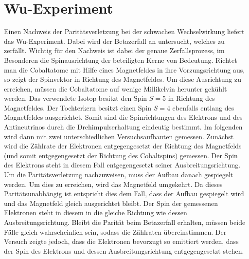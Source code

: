 \documentclass[twoside,colorback,accentcolor=tud4c,11pt]{tudreport}
\begin{document}
\section{Wu-Experiment}
Einen Nachweis der Paritätsverletzung bei der schwachen Wechselwirkung liefert das Wu-Experiment. Dabei wird der Betazerfall an  untersucht, welches zu  zerfällt. Wichtig für den Nachweis ist dabei der genaue Zerfallsprozess, im Besonderen die Spinausrichtung der beteiligten Kerne von Bedeutung. Richtet man die Cobaltatome mit Hilfe eines Magnetfeldes in ihre Vorzungsrichtung aus, so zeigt der Spinvektor in Richtung des Magnetfeldes. Um diese Ausrichtung zu erreichen, müssen die Cobaltatome auf wenige Millikelvin herunter gekühlt werden. Das verwendete Isotop besitzt den Spin $S=5$ in Richtung des Magnetfeldes. Der Tochterkern besitzt einen Spin $S=4$ ebenfalls entlang des Magnetfeldes ausgerichtet. Somit sind die Spinrichtungen des Elektrons und des Antineutrinos durch die Drehimpulserhaltung eindeutig bestimmt. Im folgenden wird dann mit zwei unterschiedlichen Versuchsaufbauten gemessen. Zunächst 
wird die Zählrate der Elektronen entgegengesetzt der Richtung des Magnetfelds (und somit entgegengesetzt der Richtung des Cobaltspins) gemessen. Der Spin des Elektrons steht in diesem Fall entgegengesetzt seiner Ausbreitungsrichtung. Um die Paritätsverletzung nachzuweisen, muss der Aufbau danach gespiegelt werden. Um dies zu erreichen, wird das Magnetfeld umgekehrt. Da dieses Paritätsunabhängig ist entspricht dies dem Fall, dass der Aufbau gespiegelt wird und das Magnetfeld gleich ausgerichtet bleibt. Der Spin der gemessenen Elektronen steht in diesem in die gleiche Richtung wie dessen Ausbreitungsrichtung. Bleibt die Parität beim Betazerfall erhalten, müssen beide Fälle gleich wahrscheinlich sein, sodass die Zählraten übereinstimmen. Der Versuch zeigte jedoch, dass die Elektronen bevorzugt so emittiert werden, dass der Spin des Elektrons und dessen Ausbreitungsrichtung entgegengesetzt stehen.
\newpage
\end{document}
